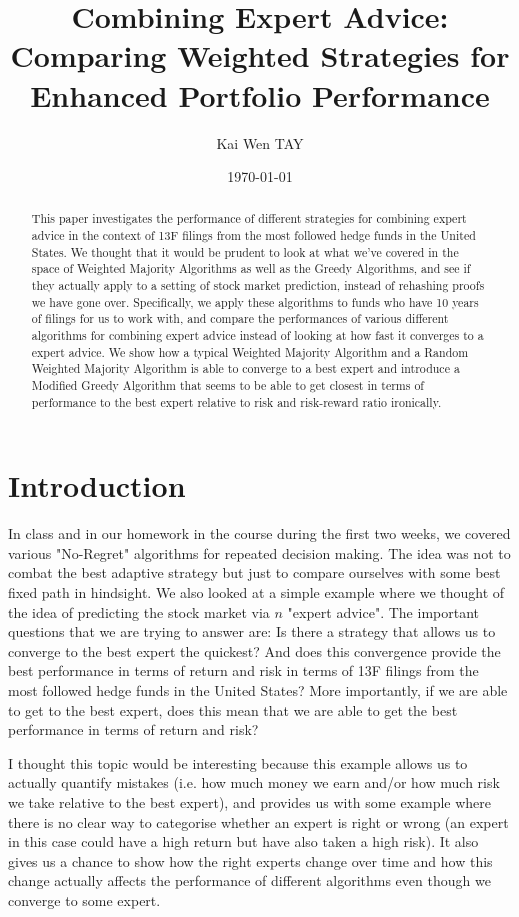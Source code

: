 \documentclass{article}
\title{Combining Expert Advice: Comparing Weighted Strategies for Enhanced Portfolio Performance}
\author{Kai Wen TAY}
\date{\today}
\begin{document}
\maketitle

\begin{abstract}
    This paper investigates the performance of different strategies for combining expert advice in the context of 13F filings from the most followed hedge funds in the United States. We thought that it would be prudent to look at what we've covered in the space of Weighted Majority Algorithms as well as the Greedy Algorithms, and see if they actually apply to a setting of stock market prediction, instead of rehashing proofs we have gone over. Specifically, we apply these algorithms to funds who have 10 years of filings for us to work with, and compare the performances of various different algorithms for combining expert advice instead of looking at how fast it converges to a expert advice. We show how a typical Weighted Majority Algorithm and a Random Weighted Majority Algorithm is able to converge to a best expert and introduce a Modified Greedy Algorithm that seems to be able to get closest in terms of performance to the best expert relative to risk and risk-reward ratio ironically.
\end{abstract}

\section{Introduction}
\label{sec:introduction}

In class and in our homework in the course during the first two weeks, we covered various "No-Regret" algorithms for repeated decision making. The idea was not to combat the best adaptive strategy but just to compare ourselves with some best fixed path in hindsight. We also looked at a simple example where we thought of the idea of predicting the stock market via $n$ "expert advice". The important questions that we are trying to answer are: Is there a strategy that allows us to converge to the best expert the quickest? And does this convergence provide the best performance in terms of return and risk in terms of 13F filings from the most followed hedge funds in the United States? More importantly, if we are able to get to the best expert, does this mean that we are able to get the best performance in terms of return and risk?

I thought this topic would be interesting because this example allows us to actually quantify mistakes (i.e. how much money we earn and/or how much risk we take relative to the best expert), and provides us with some example where there is no clear way to categorise whether an expert is right or wrong (an expert in this case could have a high return but have also taken a high risk). It also gives us a chance to show how the right experts change over time and how this change actually affects the performance of different algorithms even though we converge to some expert.
\end{document}
